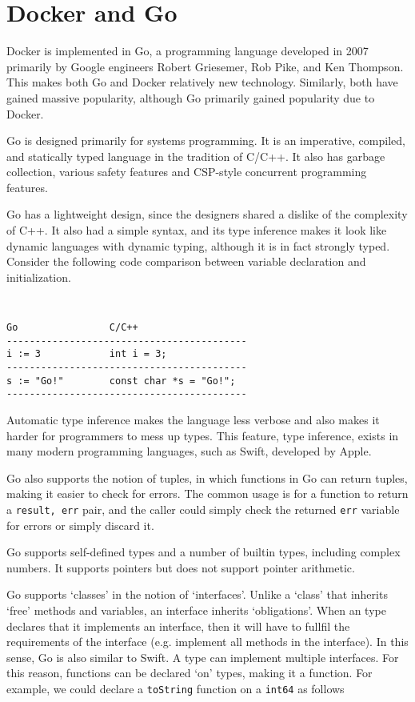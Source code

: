 \documentclass[letterpaper,twocolumn,10pt]{article}
\begin{document}
\section{Docker and Go}

Docker is implemented in Go, a programming language developed in 2007 primarily by Google engineers Robert Griesemer, Rob Pike, and Ken Thompson. This makes both Go and Docker relatively new technology. Similarly, both have gained massive popularity, although Go primarily gained popularity due to Docker.

Go is designed primarily for systems programming. It is an imperative, compiled, and statically typed language in the tradition of C/C++. It also has garbage collection, various safety features and CSP-style concurrent programming features.

Go has a lightweight design, since the designers shared a dislike of the complexity of C++. It also had a simple syntax, and its type inference makes it look like dynamic languages with dynamic typing, although it is in fact strongly typed. Consider the following code comparison between variable declaration and initialization.

{\tt \small
\begin{verbatim}
Go                C/C++
------------------------------------------
i := 3            int i = 3;
------------------------------------------
s := "Go!"        const char *s = "Go!";
------------------------------------------
\end{verbatim}
}

\noindent
Automatic type inference makes the language less verbose and also makes it harder for programmers to mess up types. This feature, type inference, exists in many modern programming languages, such as Swift, developed by Apple.

Go also supports the notion of tuples, in which functions in Go can return tuples, making it easier to check for errors. The common usage is for a function to return a {\tt result, err} pair, and the caller could simply check the returned {\tt err} variable for errors or simply discard it.

Go supports self-defined types and a number of builtin types, including complex numbers. It supports pointers but does not support pointer arithmetic.

Go supports `classes' in the notion of `interfaces'. Unlike a `class' that inherits `free' methods and variables, an interface inherits `obligations'. When an type declares that it implements an interface, then it will have to fullfil the requirements of the interface (e.g. implement all methods in the interface). In this sense, Go is also similar to Swift. A type can implement multiple interfaces. For this reason, functions can be declared `on' types, making it a function. For example, we could declare a {\tt toString} function on a {\tt int64} as follows
\end{document}
